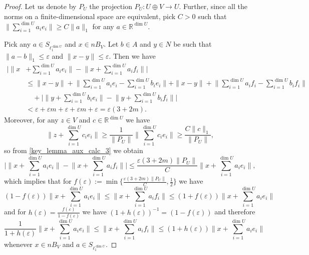 \documentclass[10pt,a4paper]{amsart}
\newcommand{\Rea}{\mathbb R}
\begin{document}
\begin{proof}Let us denote by $P_U$ the projection $P_U:U\oplus V\to U$. Further, since all the norms on a finite-dimensional space are equivalent, pick $C>0$ such that $\|\sum_{i=1}^{\dim U} a_ie_i\|\geq C\|a\|_1$ for any $a\in\Rea^{\dim U}$.

Pick any $a\in S_{\ell_1^{\dim U}}$ and $x\in nB_V$. Let $b\in A$ and $y\in N$ be such that $\|a-b\|_1\leq \varepsilon$ and $\|x-y\|\leq \varepsilon$. Then we have
	\begin{equation} \label{key_lemma_aux_calc_3}
		\begin{split} 
			\Bigg| \Big\| x & + \sum_{i=1}^{\dim U} a_i e_i \Big\| - \Big\| x + \sum_{i=1}^{\dim U} a_i f_i \Big\| \Bigg| \\
			& \leq \| x - y \| + \Big\| \sum_{i=1}^{\dim U} a_i e_i - \sum_{i=1}^{\dim U} b_i e_i \Big\| + \|x-y\|  + \Big\| \sum_{i=1}^{\dim U} a_i f_i - \sum_{i=1}^{\dim U} b_i f_i \Big\| \\
			& \quad + \Bigg| \Big\| y + \sum_{i=1}^{\dim U} b_i e_i \Big\| - \Big\| y + \sum_{i=1}^{\dim U} b_i f_i \Big\| \Bigg| \\
			& < \varepsilon + \varepsilon m + \varepsilon + \varepsilon m + \varepsilon = \varepsilon(3 + 2m).
		\end{split}
	\end{equation}
Moreover, for any $z\in V$ and $c\in \Rea^{\dim U}$ we have
\[
    \Big\|z + \sum_{i=1}^{\dim U}c_i e_i\Big\| \geq \frac{1}{\|P_U\|}\Big\|\sum_{i=1}^{\dim U}c_i e_i\Big\|\geq \frac{C\|c\|_1}{\|P_U\|},
\]
so from \eqref{key_lemma_aux_calc_3} we obtain
\[
    \Bigg| \Big\| x + \sum_{i=1}^{\dim U} a_i e_i \Big\| - \Big\| x + \sum_{i=1}^{\dim U} a_i f_i \Big\| \Bigg|\leq \frac{\varepsilon(3+2m)\|P_U\|}{C}\Big\| x + \sum_{i=1}^{\dim U} a_i e_i \Big\|,
\]
which implies that for $f(\varepsilon):=\min\{\frac{\varepsilon(3+2m)\|P_U\|}{C},\tfrac{1}{2}\}$ we have
\begin{equation}
    (1-f(\varepsilon))\Big\| x + \sum_{i=1}^{\dim U} a_i e_i \Big\|\leq \Big\| x + \sum_{i=1}^{\dim U} a_i f_i \Big\|\leq (1+f(\varepsilon))\Big\| x + \sum_{i=1}^{\dim U} a_i e_i \Big\|
\end{equation}
and for $h(\varepsilon) = \tfrac{f(\varepsilon)}{1-f(\varepsilon)}$ we have $(1+h(\varepsilon))^{-1} = (1-f(\varepsilon))$ and therefore
\begin{equation}\label{key_lemma_final_ineq}
    \frac{1}{1+h(\varepsilon)}\Big\| x + \sum_{i=1}^{\dim U} a_i e_i \Big\|\leq \Big\| x + \sum_{i=1}^{\dim U} a_i f_i \Big\|\leq (1+h(\varepsilon))\Big\| x + \sum_{i=1}^{\dim U} a_i e_i \Big\|
\end{equation}
whenever $x\in nB_V$ and $a\in S_{\ell_1^{\dim U}}$.


\end{proof}
\end{document}
